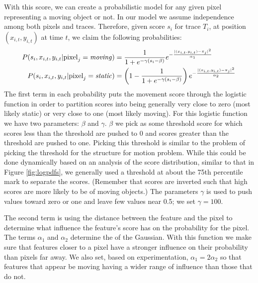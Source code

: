 With this score, we can create a probabilistic model for any given pixel representing
 a moving object or not.  In our model we assume independence among both
pixels and traces.  Therefore, given score $s_i$ for trace $T_i$, at position
$(x_{i,t},y_{i,t})$ at time $t$, we claim the following probabilities:
\begin{align}
	P(s_i,x_{i,t},y_{i,t}|{\rm pixel}_j = {\it moving})  &= \frac{1}{1 + e^{-\gamma(s_i - \beta)}} e^{- \frac{|(x_{i,t},y_{i,t}) - \pi_j|^2}{\alpha_1}}
	\\ P(s_i,x_{i,t},y_{i,t}|{\rm pixel}_j = {\it static})  &= \left( 1 - \frac{1}{1 + e^{-\gamma(s_i - \beta)}}\right) e^{- \frac{|(x_{i,t},y_{i,t}) - \pi_j|^2}{\alpha_2}}
\end{align}
The first term in each probability puts the movement score through the logistic
function in order to partition scores into being generally very close to zero
(most likely static) or very close to one (most likely moving).  For this
logistic function we have two parameters: $\beta$ and $\gamma$.  $\beta$ we
pick as some threshold score for which scores less than the threshold are
pushed to 0 and scores greater than the threshold are pushed to one.  Picking
this threshold is similar to the problem of picking the threshold for the
structure for motion problem.  While this could be done dynamically based on an
analysis of the score distribution, similar to that in Figure
\ref{fig:logpdfs}, we generally used a threshold at about the 75th percentile
mark to separate the scores.  (Remember that scores are inverted such that high
scores are more likely to be of moving objects.)  The parameters $\gamma$ is
used to push values toward zero or one and leave few values near 0.5; we set
$\gamma = 100$.

The second term is  using the distance between
the feature and the pixel to determine what influence the feature's score has
on the probability for the pixel.  The terms $\alpha_1$ and $\alpha_2$
determine the  of the Gaussian.  With this function we make sure
that features closer to a pixel have a stronger influence on their probability
than pixels far away.  We also set, based on experimentation, $\alpha_1 =
2\alpha_2$ so that features that appear be moving having a wider range of
influence than those that do not.


